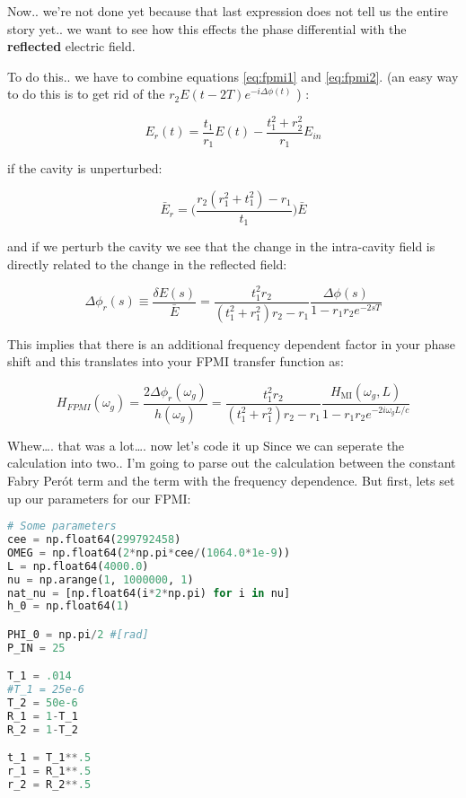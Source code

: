 Now.. we're not done yet because that last expression does not tell us
the entire story yet.. we want to see how this effects the phase
differential with the \textbf{reflected} electric field.

To do this.. we have to combine equations \ref{eq:fpmi1} and \ref{eq:fpmi2}. (an
easy way to do this is to get rid of the $ r_2 E(t - 2T) e^{-i \Delta \phi(t)} $ ) :

\begin{equation} E_r(t) = \frac{t_1}{r_1}E(t) - \frac{t_1^2 + r_2^2}{r_1} E_{in}\end{equation}

if the cavity is unperturbed:

\begin{equation} \bar{E}_r = \bigg(\frac{r_2(r_1^2 + t_1^2) - r_1}{t_1} \bigg) \bar{E} \end{equation}

and if we perturb the cavity we see that the change in the intra-cavity
field is directly related to the change in the reflected field:

\begin{equation} \Delta \phi_r(s) \equiv \frac{\delta E(s)}{\bar{E}} = \frac{t_1^2r_2}{(t_1^2 + r_1^2)r_2 -r_1} \frac{\Delta \phi(s)}{1-r_1r_2e^{-2sT}}\end{equation}

This implies that there is an additional frequency dependent factor in
your phase shift and this translates into your FPMI transfer function
as:

\begin{equation} H_{FPMI}(\omega_g) = \frac{2 \Delta \phi_r(\omega_g)}{h(\omega_g)} =  \frac{t_1^2r_2}{(t_1^2 + r_1^2)r_2 -r_1} \frac{H_{\mathrm{MI}}(\omega_g, L)}{1-r_1r_2e^{-2i \omega_g L /c }}  \end{equation}

Whew\ldots. that was a lot\ldots. now let's code it up Since we can
seperate the calculation into two.. I'm going to parse out the
calculation between the constant Fabry Perót term and the term with the
frequency dependence. But first, lets set up our parameters for our
FPMI:

\begin{spacing}{1.2} \begin{lstlisting}[frame=single, language=Python]
# Some parameters
cee = np.float64(299792458)
OMEG = np.float64(2*np.pi*cee/(1064.0*1e-9))
L = np.float64(4000.0)
nu = np.arange(1, 1000000, 1)
nat_nu = [np.float64(i*2*np.pi) for i in nu]
h_0 = np.float64(1)

PHI_0 = np.pi/2 #[rad]
P_IN = 25

T_1 = .014
#T_1 = 25e-6 
T_2 = 50e-6
R_1 = 1-T_1
R_2 = 1-T_2

t_1 = T_1**.5
r_1 = R_1**.5
r_2 = R_2**.5
\end{lstlisting} \end{spacing}

